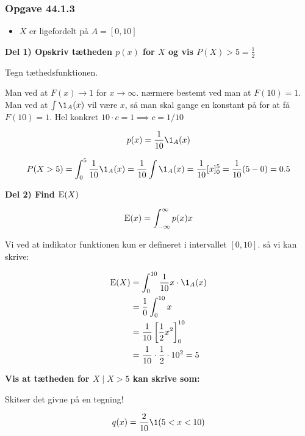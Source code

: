 \subsubsection{Opgave 44.1.3}


\begin{itemize}
    \item $X$ er ligefordelt på $A = [0,10]$
\end{itemize}

\textbf{Del 1) Opskriv tætheden $p(x)$ for $X$ og vis $P(X) > 5 = \frac{1}{2}$}

Tegn tæthedsfunktionen.

Man ved at $F(x) \rightarrow 1$ for $x\rightarrow \infty$. nærmere bestemt ved man at $F(10) = 1$.
Man ved at $\int \1_{A}(x)$ vil være $x$, så man skal gange en konstant på for at få $F(10) = 1$. Hel konkret $10\cdot c = 1 \implies c = 1/10$

\begin{equation}
    p(x) = \frac{1}{10}\1_{A}(x)
\end{equation}

\begin{equation}
    P(X > 5) = \int_{0}^{5} \frac{1}{10}\1_{A}(x) = \frac{1}{10}\int \1_{A}(x) = \frac{1}{10} [x]_{0}^{5}= \frac{1}{10}(5 - 0) = 0.5
\end{equation}

\textbf{Del 2) Find $\text{E}(X)$}

\begin{equation}
    \text{E}(x) = \int_{-\infty}^{\infty} p(x)x
\end{equation}

Vi ved at indikator funktionen kun er defineret i intervallet $[0,10]$. så vi kan skrive:

\begin{align}
    \E(X) &= \int_{0}^{10} \frac{1}{10} x \cdot \1_{A}(x)  \\
    &= \frac{1}{0} \int_{0}^{10} x \\
    &= \frac{1}{10}\lsp\frac{1}{2}x^2\rsp_0^{10} \\
    &= \frac{1}{10}\cdot\frac{1}{2}\cdot10^2 = 5
\end{align}

\textbf{Vis at tætheden for $X\mid X>5$  kan skrive som:}

Skitser det givne på en tegning!

\begin{equation}
    q(x) = \frac{2}{10}\1(5 < x < 10)
\end{equation}

